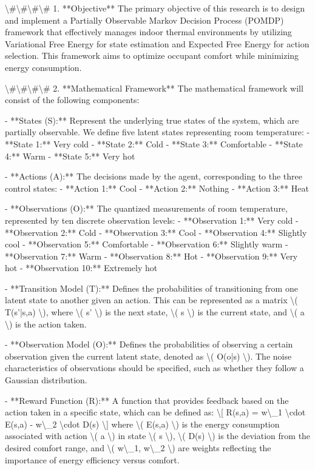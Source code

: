 \documentclass[11pt,a4paper]{article}
\begin{document}
\textbackslash{}#\textbackslash{}#\textbackslash{}#\textbackslash{}# 1. **Objective**
The primary objective of this research is to design and implement a Partially Observable Markov Decision Process (POMDP) framework that effectively manages indoor thermal environments by utilizing Variational Free Energy for state estimation and Expected Free Energy for action selection. This framework aims to optimize occupant comfort while minimizing energy consumption.

\textbackslash{}#\textbackslash{}#\textbackslash{}#\textbackslash{}# 2. **Mathematical Framework**
The mathematical framework will consist of the following components:

- **States (S):** Represent the underlying true states of the system, which are partially observable. We define five latent states representing room temperature:
  - **State 1:** Very cold
  - **State 2:** Cold
  - **State 3:** Comfortable
  - **State 4:** Warm
  - **State 5:** Very hot

- **Actions (A):** The decisions made by the agent, corresponding to the three control states:
  - **Action 1:** Cool
  - **Action 2:** Nothing
  - **Action 3:** Heat

- **Observations (O):** The quantized measurements of room temperature, represented by ten discrete observation levels:
  - **Observation 1:** Very cold
  - **Observation 2:** Cold
  - **Observation 3:** Cool
  - **Observation 4:** Slightly cool
  - **Observation 5:** Comfortable
  - **Observation 6:** Slightly warm
  - **Observation 7:** Warm
  - **Observation 8:** Hot
  - **Observation 9:** Very hot
  - **Observation 10:** Extremely hot

- **Transition Model (T):** Defines the probabilities of transitioning from one latent state to another given an action. This can be represented as a matrix \textbackslash{}( T(s'|s,a) \textbackslash{}), where \textbackslash{}( s' \textbackslash{}) is the next state, \textbackslash{}( s \textbackslash{}) is the current state, and \textbackslash{}( a \textbackslash{}) is the action taken.

- **Observation Model (O):** Defines the probabilities of observing a certain observation given the current latent state, denoted as \textbackslash{}( O(o|s) \textbackslash{}). The noise characteristics of observations should be specified, such as whether they follow a Gaussian distribution.

- **Reward Function (R):** A function that provides feedback based on the action taken in a specific state, which can be defined as:
  \textbackslash{}[
  R(s,a) = w\textbackslash{}_1 \textbackslash{}cdot E(s,a) - w\textbackslash{}_2 \textbackslash{}cdot D(s)
  \textbackslash{}]
  where \textbackslash{}( E(s,a) \textbackslash{}) is the energy consumption associated with action \textbackslash{}( a \textbackslash{}) in state \textbackslash{}( s \textbackslash{}), \textbackslash{}( D(s) \textbackslash{}) is the deviation from the desired comfort range, and \textbackslash{}( w\textbackslash{}_1, w\textbackslash{}_2 \textbackslash{}) are weights reflecting the importance of energy efficiency versus comfort.
\end{document}
